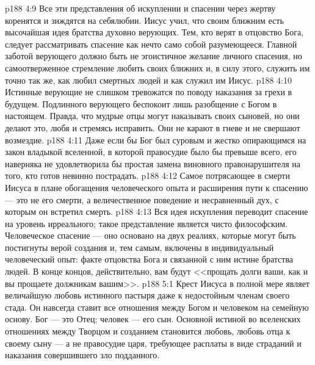 \vs p188 4:9 Все эти представления об искуплении и спасении через жертву коренятся и зиждятся на себялюбии. Иисус учил, что  своим ближним есть высочайшая идея братства духовно верующих. Тем, кто верят в отцовство Бога, следует рассматривать спасение как нечто само собой разумеющееся. Главной заботой верующего должно быть не эгоистичное желание личного спасения, но самоотверженное стремление любить своих ближних и, в силу этого, служить им точно так же, как любил смертных людей и как служил им Иисус.
\vs p188 4:10 Истинные верующие не слишком тревожатся по поводу наказания за грехи в будущем. Подлинного верующего беспокоит лишь разобщение с Богом в настоящем. Правда, что мудрые отцы могут наказывать своих сыновей, но они делают это, любя и стремясь исправить. Они не карают в гневе и не свершают возмездие.
\vs p188 4:11 Даже если бы Бог был суровым и жестко опирающимся на закон владыкой вселенной, в которой правосудие было бы превыше всего, его наверняка не удовлетворила бы простая замена виновного правонарушителя на того, кто готов невинно пострадать.
\vs p188 4:12 Самое потрясающее в смерти Иисуса в плане обогащения человеческого опыта и расширения пути к спасению --- это не  его смерти, а величественное поведение и несравненный дух, с которым он встретил смерть.
\vs p188 4:13 Вся идея искупления переводит спасение на уровень ирреального; такое представление является чисто философским. Человеческое спасение ---  оно основано на двух реалиях, которые могут быть постигнуты верой создания и, тем самым, включены в индивидуальный человеческий опыт: факте отцовства Бога и связанной с ним истине братства людей. В конце концов, действительно, вам будут <<прощать долги ваши, как и вы прощаете должникам вашим>>.
\vs p188 5:1 Крест Иисуса в полной мере являет величайшую любовь истинного пастыря даже к недостойным членам своего стада. Он навсегда ставит все отношения между Богом и человеком на семейную основу. Бог --- это Отец; человек --- его сын. Основной истиной во вселенских отношениях между Творцом и созданием становится любовь, любовь отца к своему сыну --- а не правосудие царя, требующее расплаты в виде страданий и наказания совершившего зло подданного.
